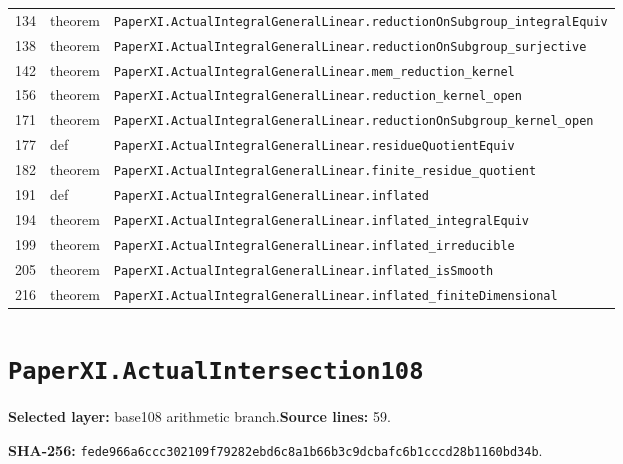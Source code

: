 \documentclass[10pt,oneside]{book}
\begin{document}
\begin{longtable}{@{}p{}p{}p{}@{}}
134&theorem&\nolinkurl{PaperXI.ActualIntegralGeneralLinear.reductionOnSubgroup_integralEquiv}\\

138&theorem&\nolinkurl{PaperXI.ActualIntegralGeneralLinear.reductionOnSubgroup_surjective}\\

142&theorem&\nolinkurl{PaperXI.ActualIntegralGeneralLinear.mem_reduction_kernel}\\

156&theorem&\nolinkurl{PaperXI.ActualIntegralGeneralLinear.reduction_kernel_open}\\

171&theorem&\nolinkurl{PaperXI.ActualIntegralGeneralLinear.reductionOnSubgroup_kernel_open}\\

177&def&\nolinkurl{PaperXI.ActualIntegralGeneralLinear.residueQuotientEquiv}\\

182&theorem&\nolinkurl{PaperXI.ActualIntegralGeneralLinear.finite_residue_quotient}\\

191&def&\nolinkurl{PaperXI.ActualIntegralGeneralLinear.inflated}\\

194&theorem&\nolinkurl{PaperXI.ActualIntegralGeneralLinear.inflated_integralEquiv}\\

199&theorem&\nolinkurl{PaperXI.ActualIntegralGeneralLinear.inflated_irreducible}\\

205&theorem&\nolinkurl{PaperXI.ActualIntegralGeneralLinear.inflated_isSmooth}\\

216&theorem&\nolinkurl{PaperXI.ActualIntegralGeneralLinear.inflated_finiteDimensional}\\

\bottomrule\end{longtable}

\section{\texorpdfstring{\nolinkurl{PaperXI.ActualIntersection108}}{PaperXI.ActualIntersection108}}\label{module:PaperXI.ActualIntersection108}

\textbf{Selected layer:} base108 arithmetic branch.\quad\textbf{Source lines:} 59.\par\textbf{SHA-256:} {\scriptsize\nolinkurl{fede966a6ccc302109f79282ebd6c8a1b66b3c9dcbafc6b1cccd28b1160bd34b}}.
\end{document}
